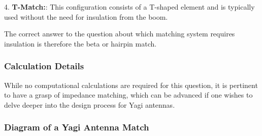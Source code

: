 4. \textbf{T-Match:}: This configuration consists of a T-shaped element and is typically used without the need for insulation from the boom.

The correct answer to the question about which matching system requires insulation is therefore the beta or hairpin match.

\subsubsection{Calculation Details}

While no computational calculations are required for this question, it is pertinent to have a grasp of impedance matching, which can be advanced if one wishes to delve deeper into the design process for Yagi antennas.

\subsubsection{Diagram of a Yagi Antenna Match}


